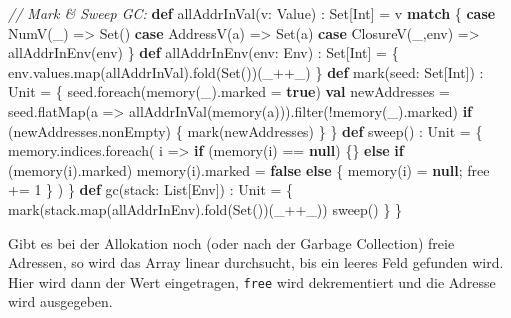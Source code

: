 \documentclass[]{article}
\newenvironment{Shaded}{}{}
\newcommand{\CommentTok}[1]{\textcolor[rgb]{0.38,0.63,0.69}{\textit{#1}}}
\newcommand{\DecValTok}[1]{\textcolor[rgb]{0.25,0.63,0.44}{#1}}
\newcommand{\FunctionTok}[1]{\textcolor[rgb]{0.02,0.16,0.49}{#1}}
\newcommand{\KeywordTok}[1]{\textcolor[rgb]{0.00,0.44,0.13}{\textbf{#1}}}
\newcommand{\NormalTok}[1]{#1}
\begin{document}
\begin{Shaded}
\begin{Highlighting}[]
  \CommentTok{// Mark \& Sweep GC:}
  \KeywordTok{def} \FunctionTok{allAddrInVal}\NormalTok{(v: Value) : Set[Int] = v }\KeywordTok{match}\NormalTok{ \{}
    \KeywordTok{case} \FunctionTok{NumV}\NormalTok{(\_) =\textgreater{} Set()}
    \KeywordTok{case} \FunctionTok{AddressV}\NormalTok{(a) =\textgreater{} Set(a)}
    \KeywordTok{case} \FunctionTok{ClosureV}\NormalTok{(\_,env) =\textgreater{} }\FunctionTok{allAddrInEnv}\NormalTok{(env)}
\NormalTok{  \}}
  \KeywordTok{def} \FunctionTok{allAddrInEnv}\NormalTok{(env: Env) : Set[Int] = \{}
\NormalTok{    env.}\FunctionTok{values}\NormalTok{.}\FunctionTok{map}\NormalTok{(allAddrInVal).}\FunctionTok{fold}\NormalTok{(Set())(\_++\_)}
\NormalTok{  \}}
  \KeywordTok{def} \FunctionTok{mark}\NormalTok{(seed: Set[Int]) : Unit = \{}
\NormalTok{    seed.}\FunctionTok{foreach}\NormalTok{(}\FunctionTok{memory}\NormalTok{(\_).}\FunctionTok{marked}\NormalTok{ = }\KeywordTok{true}\NormalTok{)}
    \KeywordTok{val}\NormalTok{ newAddresses = }
\NormalTok{      seed.}\FunctionTok{flatMap}\NormalTok{(a =\textgreater{} }\FunctionTok{allAddrInVal}\NormalTok{(}\FunctionTok{memory}\NormalTok{(a))).}\FunctionTok{filter}\NormalTok{(!}\FunctionTok{memory}\NormalTok{(\_).}\FunctionTok{marked}\NormalTok{)}
    \KeywordTok{if}\NormalTok{ (newAddresses.}\FunctionTok{nonEmpty}\NormalTok{) \{}
      \FunctionTok{mark}\NormalTok{(newAddresses)}
\NormalTok{    \}}
\NormalTok{  \}}
  \KeywordTok{def} \FunctionTok{sweep}\NormalTok{() : Unit = \{}
\NormalTok{    memory.}\FunctionTok{indices}\NormalTok{.}\FunctionTok{foreach}\NormalTok{(}
\NormalTok{      i =\textgreater{} }\KeywordTok{if}\NormalTok{ (}\FunctionTok{memory}\NormalTok{(i) == }\KeywordTok{null}\NormalTok{) \{\}}
      \KeywordTok{else} \KeywordTok{if}\NormalTok{ (}\FunctionTok{memory}\NormalTok{(i).}\FunctionTok{marked}\NormalTok{) }\FunctionTok{memory}\NormalTok{(i).}\FunctionTok{marked}\NormalTok{ = }\KeywordTok{false}
      \KeywordTok{else}\NormalTok{ \{ }\FunctionTok{memory}\NormalTok{(i) = }\KeywordTok{null}\NormalTok{; free += }\DecValTok{1}\NormalTok{ \}}
\NormalTok{    )}
\NormalTok{  \}}
  \KeywordTok{def} \FunctionTok{gc}\NormalTok{(stack: List[Env]) : Unit = \{}
    \FunctionTok{mark}\NormalTok{(stack.}\FunctionTok{map}\NormalTok{(allAddrInEnv).}\FunctionTok{fold}\NormalTok{(Set())(\_++\_))}
    \FunctionTok{sweep}\NormalTok{()}
\NormalTok{  \}}
\NormalTok{\}}
\end{Highlighting}
\end{Shaded}

Gibt es bei der Allokation noch (oder nach der Garbage Collection) freie
Adressen, so wird das Array linear durchsucht, bis ein leeres Feld
gefunden wird. Hier wird dann der Wert eingetragen, \texttt{free} wird
dekrementiert und die Adresse wird ausgegeben.
\end{document}
